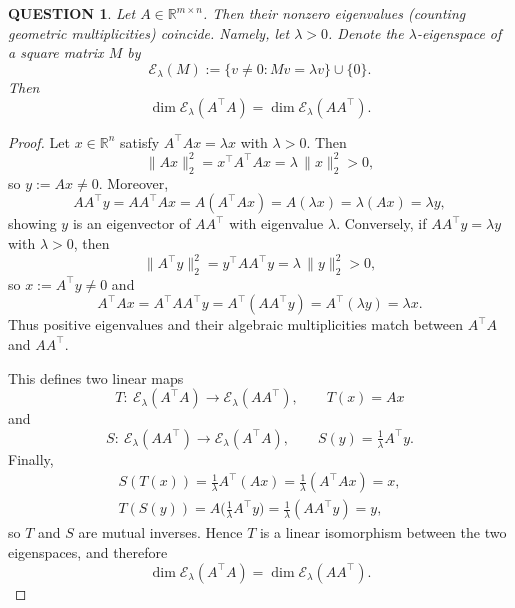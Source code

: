 \documentclass[12pt]{article}
\renewcommand{\(}{\left(}%
\renewcommand{\)}{\right)}%
\renewcommand{\[}{\left[}%
\renewcommand{\]}{\right]}%
\newtheorem{question}{QUESTION}[section]}
\newtheorem{proof}{Proof.}}
\begin{document}
\begin{question}
	Let $A\in\mathbb{R}^{m\times n}$. Then their nonzero eigenvalues (counting geometric multiplicities) coincide. Namely, let $\lambda>0$. Denote the $\lambda$-eigenspace of a square matrix $M$ by
\begin{equation*}
	\mathcal{E}_\lambda(M):=\{v\neq 0: Mv=\lambda v\}\cup\{0\}.
\end{equation*}
Then
\begin{equation*}
	\dim \mathcal{E}_\lambda(A^\top A)=\dim \mathcal{E}_\lambda(AA^\top).
\end{equation*}
\end{question}
\begin{proof}
Let $x\in\mathbb{R}^n$ satisfy $A^\top A x=\lambda x$ with $\lambda>0$. Then
\begin{equation*}
\|Ax\|_2^2=x^\top A^\top A x=\lambda\,\|x\|_2^2>0,
\end{equation*}
so $y:=Ax\neq 0$. Moreover,
\begin{equation*}
AA^\top y=AA^\top Ax=A(A^\top A x)=A(\lambda x)=\lambda (Ax)=\lambda y,
\end{equation*}
showing $y$ is an eigenvector of $AA^\top$ with eigenvalue $\lambda$.
Conversely, if $AA^\top y=\lambda y$ with $\lambda>0$, then
\begin{equation*}
\|A^\top y\|_2^2=y^\top AA^\top y=\lambda\,\|y\|_2^2>0,
\end{equation*}
so $x:=A^\top y\neq 0$ and
\begin{equation*}
A^\top A x=A^\top A A^\top y=A^\top(AA^\top y)=A^\top(\lambda y)=\lambda x.
\end{equation*}
Thus positive eigenvalues and their algebraic multiplicities match between $A^\top A$ and $AA^\top$. 

This defines two linear maps
\begin{equation*}
T:\ \mathcal{E}_\lambda(A^\top A)\to \mathcal{E}_\lambda(AA^\top),\qquad T(x)=Ax
\end{equation*}
and
\begin{equation*}
S:\ \mathcal{E}_\lambda(AA^\top)\to \mathcal{E}_\lambda(A^\top A),\qquad S(y)=\tfrac{1}{\lambda}A^\top y.
\end{equation*}
Finally,
\begin{equation*}
\begin{split}
	S(T(x))=\tfrac{1}{\lambda}A^\top(Ax)=\tfrac{1}{\lambda}(A^\top A x)=x,\\
T(S(y))=A\big(\tfrac{1}{\lambda}A^\top y\big)=\tfrac{1}{\lambda}(AA^\top y)=y,
\end{split}
\end{equation*}
so $T$ and $S$ are mutual inverses. Hence $T$ is a linear isomorphism between the two eigenspaces, and therefore
\begin{equation*}
\dim \mathcal{E}_\lambda(A^\top A)=\dim \mathcal{E}_\lambda(AA^\top).
\end{equation*}
\end{proof}
\end{document}
